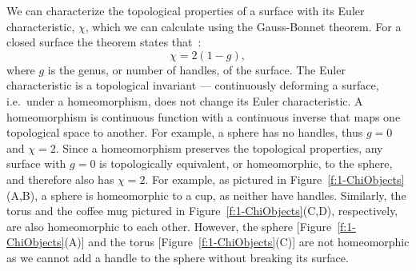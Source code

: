 We can characterize the topological properties of a surface with its Euler characteristic, $\chi$, which we can calculate using the Gauss-Bonnet theorem.
For a closed surface the theorem states that~\cite{RN23}:
\begin{equation}
  \chi = 2(1-g),\label{e:1-GB1}
\end{equation}
where $g$ is the genus, or number of handles, of the surface.
The Euler characteristic is a topological invariant --- continuously deforming a surface, i.e.\ under a homeomorphism, does not change its Euler characteristic.
A homeomorphism is continuous function with a continuous inverse that maps one topological space to another.
For example, a sphere has no handles, thus $g = 0$ and $\chi=2$.
Since a homeomorphism preserves the topological properties, any surface with $g=0$ is topologically equivalent, or homeomorphic, to the sphere, and therefore also has $\chi=2$.
For example, as pictured in Figure~\ref{f:1-ChiObjects}(A,B), a sphere is homeomorphic to a cup, as neither have handles.
Similarly, the torus and the coffee mug pictured in Figure~\ref{f:1-ChiObjects}(C,D), respectively, are also homeomorphic to each other.
However, the sphere [Figure~\ref{f:1-ChiObjects}(A)] and the torus [Figure~\ref{f:1-ChiObjects}(C)] are not homeomorphic as we cannot add a handle to the sphere without breaking its surface.

